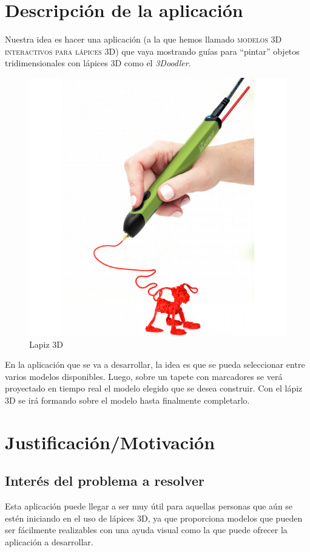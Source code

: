 \documentclass[12pt,a4paper]{article}
\begin{document}
\section{Descripción de la aplicación}
Nuestra idea es hacer una aplicación (a la que hemos llamado \textsc{modelos 3D interactivos para lápices 3D}) que vaya mostrando guías para ``pintar'' objetos tridimensionales con lápices 3D como el \emph{3Doodler}.
\begin{figure}[H]
    \centering
    \includegraphics{3dpen.png}
    \caption{Lapiz 3D}
    \label{fig:my_label}
\end{figure}

En la aplicación que se va a desarrollar, la idea es que se pueda seleccionar entre varios modelos disponibles. Luego, sobre un tapete con marcadores se verá proyectado en tiempo real el modelo elegido que se desea construir. Con el lápiz 3D se irá formando  sobre el modelo hasta finalmente completarlo.

\section{Justificación/Motivación}
\subsection{Interés del problema a resolver}
Esta aplicación puede llegar a ser muy útil para aquellas personas que aún se estén iniciando en el uso de lápices 3D, ya que proporciona modelos que pueden ser fácilmente realizables con una ayuda visual como la que puede ofrecer la aplicación a desarrollar.
\end{document}
